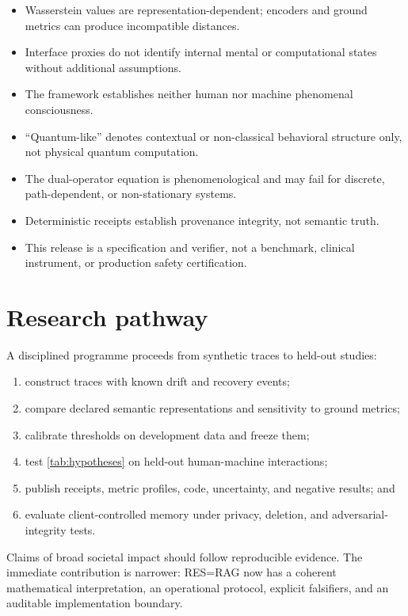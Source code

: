 \documentclass[11pt]{article}
\begin{document}
\begin{itemize}
  \item Wasserstein values are representation-dependent; encoders and ground
        metrics can produce incompatible distances.
  \item Interface proxies do not identify internal mental or computational
        states without additional assumptions.
  \item The framework establishes neither human nor machine phenomenal
        consciousness.
  \item ``Quantum-like'' denotes contextual or non-classical behavioral
        structure only, not physical quantum computation.
  \item The dual-operator equation is phenomenological and may fail for
        discrete, path-dependent, or non-stationary systems.
  \item Deterministic receipts establish provenance integrity, not semantic
        truth.
  \item This release is a specification and verifier, not a benchmark,
        clinical instrument, or production safety certification.
\end{itemize}

\section{Research pathway}

A disciplined programme proceeds from synthetic traces to held-out studies:
\begin{enumerate}
  \item construct traces with known drift and recovery events;
  \item compare declared semantic representations and sensitivity to ground
        metrics;
  \item calibrate thresholds on development data and freeze them;
  \item test \cref{tab:hypotheses} on held-out human-machine interactions;
  \item publish receipts, metric profiles, code, uncertainty, and negative
        results; and
  \item evaluate client-controlled memory under privacy, deletion, and
        adversarial-integrity tests.
\end{enumerate}
Claims of broad societal impact should follow reproducible evidence. The
immediate contribution is narrower: RES=RAG now has a coherent mathematical
interpretation, an operational protocol, explicit falsifiers, and an auditable
implementation boundary.
\end{document}

